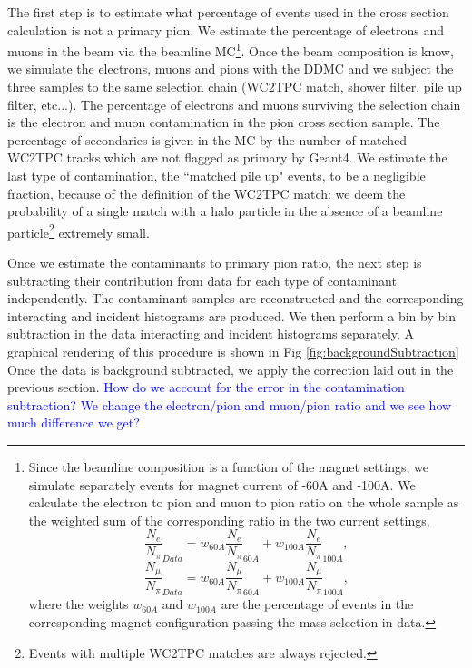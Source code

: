 The first step is to estimate what percentage of events used in the cross section calculation is not a primary pion.  
We estimate the percentage of electrons and muons in the beam via the beamline MC\footnote{Since the beamline composition is a function of the magnet settings, we simulate separately events for magnet current of -60A and -100A. 
We calculate the electron to pion and muon to pion ratio on the whole sample as the weighted sum of the corresponding ratio in the two current settings, 
\begin{equation}
\frac{N_e}{N_\pi}_{Data} = w_{60A}\frac{N_e}{N_\pi}_{60A}  + w_{100A}\frac{N_e}{N_\pi}_{100A},
\end{equation}
\begin{equation}
\frac{N_\mu}{N_\pi}_{Data} = w_{60A}\frac{N_\mu}{N_\pi}_{60A}  + w_{100A}\frac{N_\mu}{N_\pi}_{100A},
\end{equation}
where the weights $w_{60A}$ and $w_{100A}$ are the percentage of events in the corresponding magnet configuration passing the mass selection in data. }.
Once the beam composition is know,  we simulate the electrons, muons and pions with the DDMC and we subject the three samples to the same selection chain (WC2TPC match, shower filter, pile up filter, etc...). The percentage of electrons and muons surviving the selection chain is the  electron and muon contamination in the pion cross section sample.
The percentage of secondaries is given in the MC by the number of matched WC2TPC tracks which are not flagged as primary by Geant4.
We estimate the last type of contamination, the ``matched pile up" events, to be a negligible fraction, because of the definition of the WC2TPC match: we deem the probability of a single match with a halo particle in the absence of a beamline particle\footnote{ Events with multiple WC2TPC matches are always rejected.} extremely small.


Once we estimate the contaminants to primary pion ratio, the next step is subtracting their contribution from data for each type of contaminant independently. The contaminant samples are reconstructed and the corresponding interacting and incident histograms are produced. We then perform a bin by bin subtraction in the data interacting and incident histograms separately. A graphical rendering of this procedure is shown in Fig \ref{fig:backgroundSubtraction}
Once the data is background subtracted, we apply the correction laid out in the previous section.
\textcolor{blue}{How do we account for the error in the contamination subtraction? We change the electron/pion and muon/pion ratio and we see how much difference we get?}

